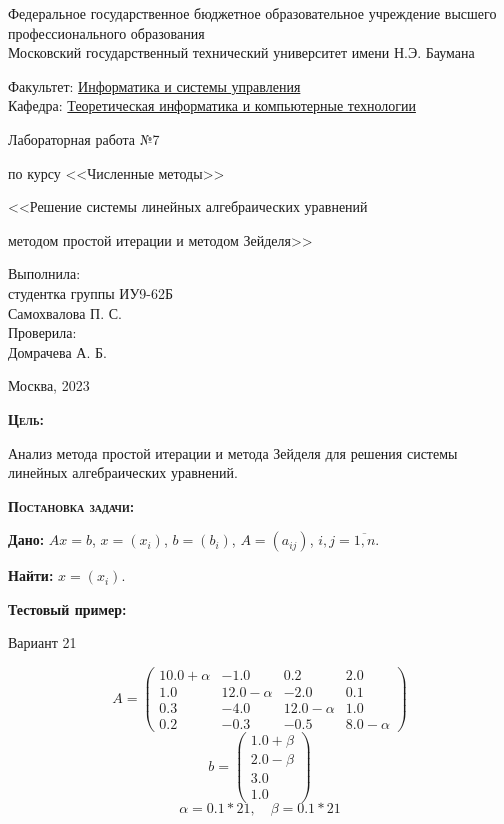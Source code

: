\documentclass [12pt]{article}
\title{}
\date{}
\author{}
\begin{document}
\begin{titlepage}
\thispagestyle{empty}
\begin{center}
Федеральное государственное бюджетное образовательное учреждение высшего профессионального образования \\Московский государственный технический университет имени Н.Э. Баумана

\end{center}
\bigskip
\begin{flushleft}
Факультет: \underline{Информатика и системы управления}\\
Кафедра: \underline{Теоретическая информатика и компьютерные технологии}
\end{flushleft}
\vfill
\centerline{\large{Лабораторная работа №7}}
\centerline{\large{по курсу <<Численные методы>>}}
\centerline{\large{<<Решение системы линейных алгебраических уравнений}}
\centerline{\large{методом простой итерации и методом Зейделя>>}}
\vfill
\hfill\parbox{5cm} {
           Выполнила:\\
           студентка группы ИУ9-62Б \hfill \\
           Самохвалова П. С.\hfill \medskip\\
           Проверила:\\
           Домрачева А. Б.\hfill
       }
\centerline{Москва, 2023}
\clearpage
\end{titlepage}

\textsc{\textbf{Цель:}}

Анализ метода простой итерации и метода Зейделя для решения системы линейных алгебраических уравнений.

\textsc{\textbf{Постановка задачи:}}

\textbf{Дано:}  $Ax = b$, $x = (x_{i})$, $b = (b_{i})$, $A = (a_{ij})$, $i,j=\overline{1,n}$.

\textbf{Найти:} $x = (x_{i})$.

\textbf{Тестовый пример:}

Вариант 21

\[
    A =
    \begin{pmatrix}
      10.0 + \alpha & -1.0 & 0.2 & 2.0\\
      1.0 & 12.0 - \alpha & -2.0 & 0.1\\
      0.3 & -4.0 & 12.0 - \alpha & 1.0\\
      0.2 & -0.3 & -0.5 & 8.0 - \alpha
    \end{pmatrix}
\]
\[
  b =
  \begin{pmatrix}
    1.0 + \beta \\
    2.0 - \beta \\
    3.0 \\
    1.0
  \end{pmatrix}
\]
$$\alpha = 0.1 * 21, \quad \beta = 0.1 * 21$$
\end{document}

